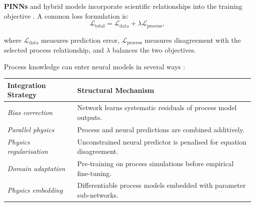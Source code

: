 \documentclass[logo,msc,ai]{infthesis}           %
\begin{document}
\textbf{PINNs} and hybrid models incorporate scientific relationships into the training objective \cite{karpatne2017Theory_C4_NN,raissi2019Physics_C4_NN, karniadakis2021Physics_C4_NN,willard2022Integrating_C4_NN}. A common loss formulation is:
\begin{equation}
\mathcal{L}_{\text{total}} = \mathcal{L}_{\text{data}} + \lambda\mathcal{L}_{\text{process}},
\label{eq:pinn-loss-general}
\end{equation}

where $\mathcal{L}_{\text{data}}$ measures prediction error, $\mathcal{L}_{\text{process}}$ measures disagreement with the selected process relationship, and $\lambda$ balances the two objectives.

Process knowledge can enter neural models in several ways
\cite{wesselkamp2024Process_C4_NN}:

\begin{table}[ht]
\centering
\footnotesize
\begin{tabular}{ll}
\hline
\textbf{Integration Strategy} & \textbf{Structural Mechanism} \\
\hline
\emph{Bias correction} & Network learns systematic residuals of process model outputs. \\
\emph{Parallel physics} & Process and neural predictions are combined additively. \\
\emph{Physics regularisation} & Unconstrained neural predictor is penalised for equation disagreement. \\
\emph{Domain adaptation} & Pre-training on process simulations before empirical fine-tuning. \\
\emph{Physics embedding} & Differentiable process models embedded with parameter sub-networks. \\
\hline
\end{tabular}
\label{tab:pinn-strategies}
\end{table}

\end{document}
